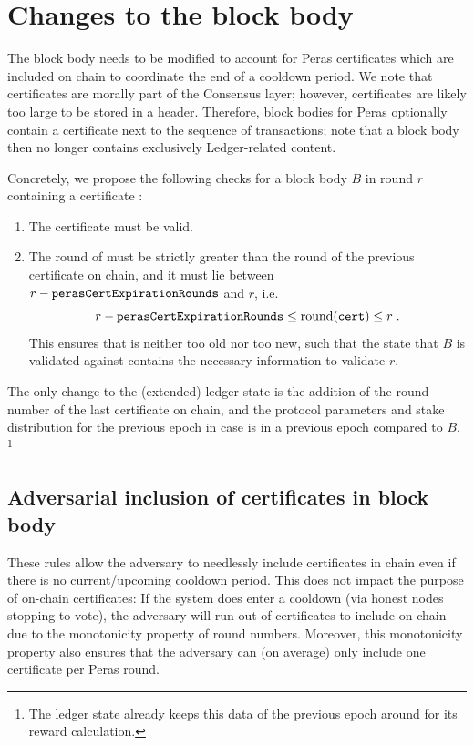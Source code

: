 \section{Changes to the block body}\label{sec:block body changes}

The block body needs to be modified to account for Peras certificates which are included on chain to coordinate the end of a cooldown period.
We note that certificates are morally part of the Consensus layer; however, certificates are likely too large to be stored in a header.
Therefore, block bodies for Peras optionally contain a certificate next to the sequence of transactions; note that a block body then no longer contains exclusively Ledger-related content.

Concretely, we propose the following checks for a block body $B$ in round $r$ containing a certificate \cert{}:
\begin{enumerate}
\item
  The certificate \cert{} must be valid.
\item
  The round of \cert{} must be strictly greater than the round of the previous certificate on chain, and it must lie between $r-\mathtt{perasCertExpirationRounds}$ and $r$, i.e.\
  \[ r-\mathtt{perasCertExpirationRounds} \le \operatorname{round}(\mathtt{cert}) \le r \;. \]
  This ensures that \cert{} is neither too old nor too new, such that the state that $B$ is validated against contains the necessary information to validate $r$.
\end{enumerate}
The only change to the (extended) ledger state is the addition of the round number of the last certificate on chain, and the protocol parameters and stake distribution for the previous epoch in case \cert{} is in a previous epoch compared to $B$.%
\footnote{The ledger state already keeps this data of the previous epoch around for its reward calculation.}

\subsection{Adversarial inclusion of certificates in block body}\label{sec:block body analysis}
These rules allow the adversary to needlessly include certificates in chain even if there is no current/upcoming cooldown period.
This does not impact the purpose of on-chain certificates:
If the system does enter a cooldown (via honest nodes stopping to vote), the adversary will run out of certificates to include on chain due to the monotonicity property of round numbers. Moreover, this monotonicity property also ensures that the adversary can (on average) only include one certificate per Peras round.

